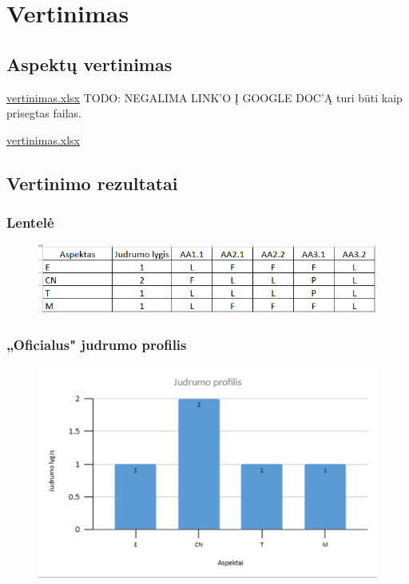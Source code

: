 \documentclass{article}
\begin{document}
\section{Vertinimas}

\subsection{Aspektų vertinimas}

\href{https://docs.google.com/spreadsheets/d/1unX_xcZLEGHqQOMCuBBXYvVhYjChxpnq/edit?usp=share_link&ouid=113452949406463366361&rtpof=true&sd=true}{vertinimas.xlsx} TODO: NEGALIMA LINK'O Į GOOGLE DOC'Ą turi būti kaip prisegtas failas.

\href{./vertinimas.xlsx}{vertinimas.xlsx}

\subsection{Vertinimo rezultatai}

\subsubsection{Lentelė}

\begin{figure}[H]%
    \centering
    \includegraphics[width=0.85\linewidth]{task-2/images/lentele.png}
\end{figure}

\subsubsection{„Oficialus" judrumo profilis}

\begin{figure}[H]%
    \centering
    \includegraphics[width=0.85\linewidth]{task-2/images/judrumo-profilis.png}
\end{figure}
\end{document}
